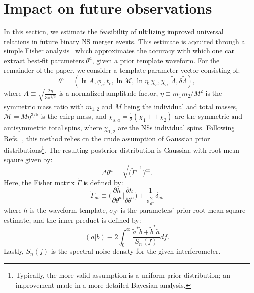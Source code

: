 \documentclass[prd,twocolumn,nofootinbib,superscriptaddress,amsmath,amssymb]{revtex4-1}
\begin{document}
\section{Impact on future observations}\label{sec:observations}
In this section, we estimate the feasibility of ultilizing improved universal relations in future binary NS merger events.
This estimate is aqcuired through a simple Fisher analysis~\cite{Finn:Fisher,Cutler:Fisher} which approximates the accuracy with which one can extract best-fit parameters $\theta^a$, given a prior template waveform.
For the remainder of the paper, we consider a template parameter vector consisting of:
\begin{equation}
\theta^a=(\ln{A},\phi_c,t_c,\ln{\mathcal{M}},\ln{\mathcal{\eta}},\chi_s,\chi_a,\tilde{\Lambda},\delta \tilde{\Lambda}),
\end{equation}
where $A \equiv \sqrt{\frac{2 \eta}{3 \pi^{1/3}}}$ is a normalized amplitude factor, $\eta \equiv m_1 m_2/M^2$ is the symmetric mass ratio with $m_{1,2}$ and $M$ being the individual and total masses, $\mathcal{M}=M \eta^{3/5}$ is the chirp mass, and $\chi_{s,a}=\frac{1}{2}(\chi_1+\pm\chi_2)$ are the symmetric and antisymmetric total spins, where $\chi_{1,2}$ are the NSs individual spins. 
Following Refs.~\cite{Cutler:Fisher,Berti:Fisher,Poisson:Fisher}, this method relies on the crude assumption of Gaussian prior distributions\footnote{Typically, the more valid assumption is a uniform prior distribution; an improvement made in a more detailed Bayesian analysis.}.
The resulting posterior distribution is Gaussian with root-mean-sqaure given by:
\begin{equation}
\Delta \theta^a=\sqrt{\Big( \tilde{\Gamma}^{-1}\Big)^{aa}}.
\end{equation}
Here, the Fisher matrix $\tilde{\Gamma}$ is defined by:
\begin{equation}
\tilde{\Gamma}_{ab} \equiv \Big( \frac{\partial h}{\partial \theta^a} \Big| \frac{\partial h}{\partial \theta^a}\Big) + \frac{1}{\sigma_{\theta^a}^2} \delta_{ab}
\end{equation}
where $h$ is the waveform template, $\sigma_{\theta^a}$ is the parameters' prior root-mean-square estimate, and the inner product is defined by:
\begin{equation}
(a|b) \equiv 2 \int^{\infty}_0\frac{\tilde{a}^*\tilde{b}+\tilde{b}^*\tilde{a}}{S_n(f)}df.
\end{equation}
Lastly, $S_n(f)$ is the spectral noise density for the given interferometer.
\end{document}

